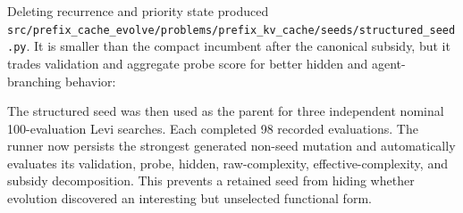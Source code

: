 \documentclass[11pt]{article}
\newcommand{\filepath}[1]{\nolinkurl{#1}}
\begin{document}
Deleting recurrence and priority state produced
\filepath{src/prefix_cache_evolve/problems/prefix_kv_cache/seeds/structured_seed.py}.
It is smaller than the compact incumbent after the canonical subsidy, but it trades
validation and aggregate probe score for better hidden and agent-branching behavior:

\begin{center}
\small
{}
\end{center}

The structured seed was then used as the parent for three independent nominal
100-evaluation Levi searches.  Each completed 98 recorded evaluations.  The runner now
persists the strongest generated non-seed mutation and automatically evaluates its
validation, probe, hidden, raw-complexity, effective-complexity, and subsidy
decomposition.  This prevents a retained seed from hiding whether evolution discovered
an interesting but unselected functional form.

\begin{center}
\scriptsize
{}
\end{center}
\end{document}
